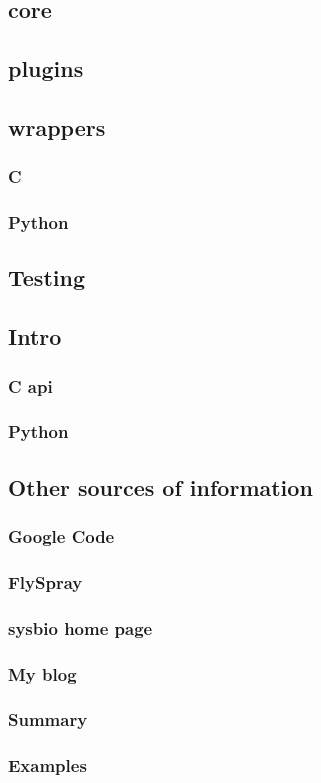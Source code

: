 \documentclass[12pt, letter, oneside]{book}
\begin{document}
\subsection{core}
\subsection{plugins}
\subsection{wrappers}
\subsubsection{C}
\subsubsection{Python}
\subsection{Testing}
\subsection{Intro}
\subsubsection{C api}
\subsubsection{Python}
\subsection{Other sources of information}
\subsubsection{Google Code}
\subsubsection{FlySpray}
\subsubsection{sysbio home page}
\subsubsection{My blog}
\subsubsection{Summary}
\subsubsection{Examples}

\begin{appendix}
\appendix

\end{appendix}



\thispagestyle{empty}

\end{document}
